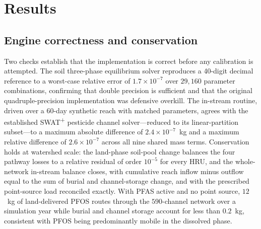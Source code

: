 \section{Results}\label{sec:results}

\subsection{Engine correctness and conservation}
Two checks establish that the implementation is correct before any calibration is attempted. The soil three-phase equilibrium solver reproduces a 40-digit decimal reference to a worst-case relative error of $1.7\times10^{-7}$ over $29{,}160$ parameter combinations, confirming that double precision is sufficient and that the original quadruple-precision implementation was defensive overkill. The in-stream routine, driven over a 60-day synthetic reach with matched parameters, agrees with the established SWAT\textsuperscript{+} pesticide channel solver---reduced to its linear-partition subset---to a maximum absolute difference of $2.4\times10^{-7}$~kg and a maximum relative difference of $2.6\times10^{-7}$ across all nine shared mass terms. Conservation holds at watershed scale: the land-phase soil-pool change balances the four pathway losses to a relative residual of order $10^{-5}$ for every HRU, and the whole-network in-stream balance closes, with cumulative reach inflow minus outflow equal to the sum of burial and channel-storage change, and with the prescribed point-source load reconciled exactly. With PFAS active and no point source, $12$~kg of land-delivered PFOS routes through the $590$-channel network over a simulation year while burial and channel storage account for less than $0.2$~kg, consistent with PFOS being predominantly mobile in the dissolved phase.

